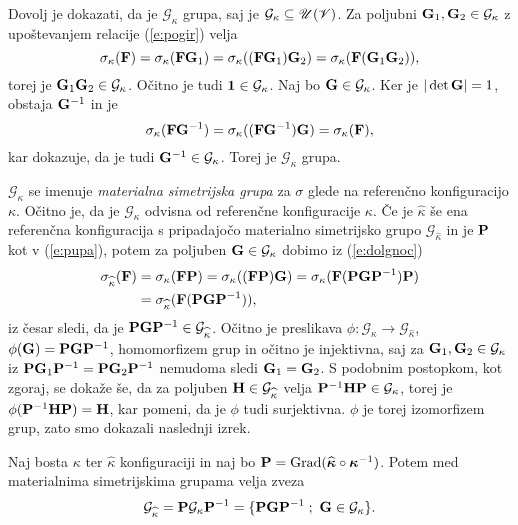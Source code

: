\proof
	Dovolj je dokazati, da je $\mathcal{G}_{\kappa}$ grupa, saj je $\mathcal{G}_{\kappa}\subseteq\mathscr{U}(\mathscr V)$.
	Za poljubni $\mathbf G_1,\mathbf G_2\in\mathcal{G}_{\kappa}$
	z upoštevanjem relacije (\ref{e:pogir}) velja
	\[
		\sigma_{\kappa}(\mathbf F)=\sigma_{\kappa}(\mathbf F\mathbf G_1)
		=\sigma_{\kappa}((\mathbf F\mathbf G_1)\mathbf G_2)=\sigma_{\kappa}(\mathbf F(\mathbf G_1\mathbf G_2)),
	\]
	torej je $\mathbf G_1\mathbf G_2\in\mathcal{G}_{\kappa}$. Očitno je tudi $\mathbf 1\in\mathcal{G}_{\kappa}$.
	Naj bo $\mathbf G\in\mathcal{G}_{\kappa}$. Ker je $|\det\mathbf G|=1$, obstaja $\mathbf G^{-1}$ in je
	\[
		\sigma_{\kappa}(\mathbf F\mathbf G^{-1})=\sigma_{\kappa}((\mathbf F\mathbf G^{-1})\mathbf G)
		=\sigma_{\kappa}(\mathbf F),
	\]
	kar dokazuje, da je tudi $\mathbf G^{-1}\in\mathcal{G}_{\kappa}$. Torej je $\mathcal{G}_{\kappa}$ grupa.
\endproof

$\mathcal{G}_{\kappa}$ se imenuje \emph{materialna simetrijska grupa} za $\sigma$ glede
na referenčno konfiguracijo $\kappa$. Očitno je, da je $\mathcal{G}_{\kappa}$ odvisna od
referenčne konfiguracije $\kappa$. Če je $\widehat{\kappa}$ še ena referenčna konfiguracija
s pripadajočo materialno simetrijsko grupo $\mathcal{G}_{\widehat{\kappa}}$
in je $\mathbf P$ kot v (\ref{e:pupa}), potem za poljuben
$\mathbf G\in\mathcal{G}_{\kappa}$ dobimo iz (\ref{e:dolgnoc})
\begin{align*}
	\sigma_{\widehat{\kappa}}(\mathbf F)&=\sigma_{\kappa}(\mathbf F\mathbf P)
	=\sigma_{\kappa}((\mathbf F\mathbf P)\mathbf G)
	=\sigma_{\kappa}(\mathbf F(\mathbf P\mathbf G\mathbf P^{-1})\mathbf P) \\
	&=\sigma_{\widehat{\kappa}}(\mathbf F(\mathbf P\mathbf G\mathbf P^{-1})),
\end{align*}
iz česar sledi, da je $\mathbf P\mathbf G\mathbf P^{-1}\in\mathcal{G}_{\widehat{\kappa}}$.
Očitno je preslikava $\phi\colon\mathcal{G}_{\kappa}\to\mathcal{G}_{\widehat{\kappa}}$,
$\phi(\mathbf G)=\mathbf P\mathbf G\mathbf P^{-1}$, homomorfizem grup in očitno je injektivna,
saj za $\mathbf G_1,\mathbf G_2\in\mathcal{G}_{\kappa}$ iz
$\mathbf P\mathbf G_1\mathbf P^{-1}=\mathbf P\mathbf G_2\mathbf P^{-1}$ nemudoma sledi $\mathbf G_1=\mathbf G_2$.
S podobnim postopkom, kot zgoraj, se dokaže še, da za poljuben $\mathbf H\in\mathcal{G}_{\widehat{\kappa}}$
velja $\mathbf P^{-1}\mathbf H\mathbf P\in\mathcal{G}_{\kappa}$, torej je
$\phi(\mathbf P^{-1}\mathbf H\mathbf P)=\mathbf H$, kar pomeni, da je $\phi$ tudi surjektivna.
$\phi$ je torej izomorfizem grup, zato smo dokazali naslednji izrek.

\begin{izrek}
	Naj bosta $\kappa$ ter $\widehat{\kappa}$ konfiguraciji in naj bo
	$\mathbf P=\mathrm{Grad}(\widehat{\boldsymbol \kappa}\circ\boldsymbol \kappa^{-1})$. Potem
	med materialnima simetrijskima grupama velja zveza
	\[
		\mathcal{G}_{\widehat{\kappa}}=\ten{P}\mathcal{G}_{\kappa}\ten{P}^{-1}
		=\{\ten{P}\ten{G}\ten{P}^{-1}\;;\ \ten{G}\in\mathcal{G}_{\kappa}\}.
	\]
\end{izrek}


